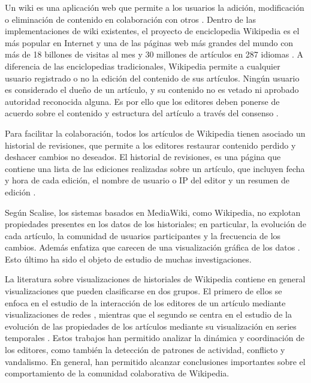 Un wiki es una aplicación web que permite a los usuarios la adición, modificación o eliminación de contenido en colaboración con otros \cite{Wikipediad}. Dentro de las implementaciones de wiki existentes, el proyecto de enciclopedia Wikipedia es el más popular en Internet y una de las páginas web más grandes del mundo con más de 18 billones de visitas al mes y 30 millones de artículos en 287 idiomas \cite{Wikipediae}.  
A diferencia de las enciclopedias tradicionales, Wikipedia permite a cualquier usuario registrado o no la edición del contenido de sus artículos. Ningún usuario es considerado el dueño de un artículo, y su contenido no es vetado ni aprobado autoridad reconocida alguna. Es por ello que los editores deben ponerse de acuerdo sobre el contenido y estructura del artículo a través del consenso \cite{Wikipediae}. 

Para facilitar la colaboración, todos los artículos de Wikipedia tienen asociado un historial de revisiones, que permite a los editores restaurar contenido perdido y deshacer cambios no deseados. El historial de revisiones, es una página que contiene una lista de las ediciones realizadas sobre un artículo, que incluyen fecha y hora de cada edición, el nombre de usuario o IP del editor y un resumen de edición \cite{Wikipediac}.

Según Scalise, los sistemas basados en MediaWiki, como Wikipedia, no explotan propiedades presentes en los datos de los historiales; en particular, la evolución de cada artículo, la comunidad de usuarios participantes y la frecuencia de los cambios. Además enfatiza que carecen de una visualización gráfica de los datos \cite{Scalise2008a}. Esto último ha sido el objeto de estudio de muchas investigaciones.

La literatura sobre visualizaciones de historiales de Wikipedia contiene en general visualizaciones que pueden clasificarse en dos grupos. El primero de ellos se enfoca en el estudio de la interacción de los editores de un artículo mediante visualizaciones de redes \cite{Sabel2007a}\cite{Suh2007a}\cite{Keegan2012a}, mientras que el segundo se centra en el estudio de la evolución de las propiedades de los artículos mediante su visualización en series temporales \cite{Viegas2004a}\cite{Wattenberg2007a}\cite{Nunes2008a}. Estos trabajos han permitido analizar la dinámica y coordinación de los editores, como también la detección de patrones de actividad, conflicto y vandalismo. En general, han permitido alcanzar conclusiones importantes sobre el comportamiento de la comunidad colaborativa de Wikipedia. 

